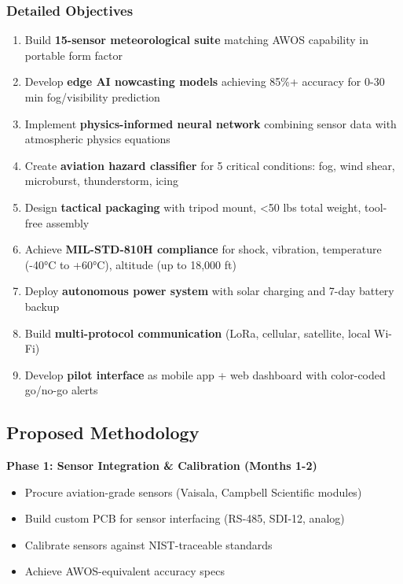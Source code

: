 \subsubsection{Detailed Objectives}
\begin{enumerate}[leftmargin=*]
    \item Build \textbf{15-sensor meteorological suite} matching AWOS capability in portable form factor
    \item Develop \textbf{edge AI nowcasting models} achieving 85\%+ accuracy for 0-30 min fog/visibility prediction
    \item Implement \textbf{physics-informed neural network} combining sensor data with atmospheric physics equations
    \item Create \textbf{aviation hazard classifier} for 5 critical conditions: fog, wind shear, microburst, thunderstorm, icing
    \item Design \textbf{tactical packaging} with tripod mount, <50 lbs total weight, tool-free assembly
    \item Achieve \textbf{MIL-STD-810H compliance} for shock, vibration, temperature (-40°C to +60°C), altitude (up to 18,000 ft)
    \item Deploy \textbf{autonomous power system} with solar charging and 7-day battery backup
    \item Build \textbf{multi-protocol communication} (LoRa, cellular, satellite, local Wi-Fi)
    \item Develop \textbf{pilot interface} as mobile app + web dashboard with color-coded go/no-go alerts
\end{enumerate}

\subsection{Proposed Methodology}

\textbf{Phase 1: Sensor Integration \& Calibration (Months 1-2)}
\begin{itemize}
    \item Procure aviation-grade sensors (Vaisala, Campbell Scientific modules)
    \item Build custom PCB for sensor interfacing (RS-485, SDI-12, analog)
    \item Calibrate sensors against NIST-traceable standards
    \item Achieve AWOS-equivalent accuracy specs
\end{itemize}

